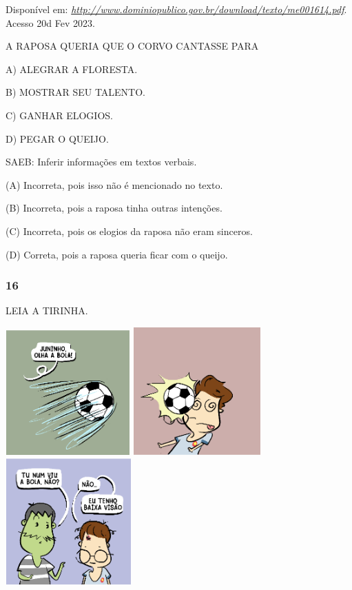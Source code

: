 Disponível em:
\href{http://www.dominiopublico.gov.br/download/texto/me001614.pdf}{\emph{http://www.dominiopublico.gov.br/download/texto/me001614.pdf}}.
Acesso 20d Fev 2023.

A RAPOSA QUERIA QUE O CORVO CANTASSE PARA

A) ALEGRAR A FLORESTA.

B) MOSTRAR SEU TALENTO.

C) GANHAR ELOGIOS.

D) PEGAR O QUEIJO.

SAEB: Inferir informações em textos verbais.

(A) Incorreta, pois isso não é mencionado no texto.

(B) Incorreta, pois a raposa tinha outras intenções.

(C) Incorreta, pois os elogios da raposa não eram sinceros.

(D) Correta, pois a raposa queria ficar com o queijo.\protect\hypertarget{_heading=h.jen2jvep4ux3}{}{}

\subsubsection{16}\label{section-72}

LEIA A TIRINHA.

\includegraphics[width=1.88542in,height=1.88542in]{media/image236.png}
\includegraphics[width=1.92708in,height=1.92708in]{media/image237.png}
\includegraphics[width=1.90625in,height=1.90625in]{media/image238.png}


